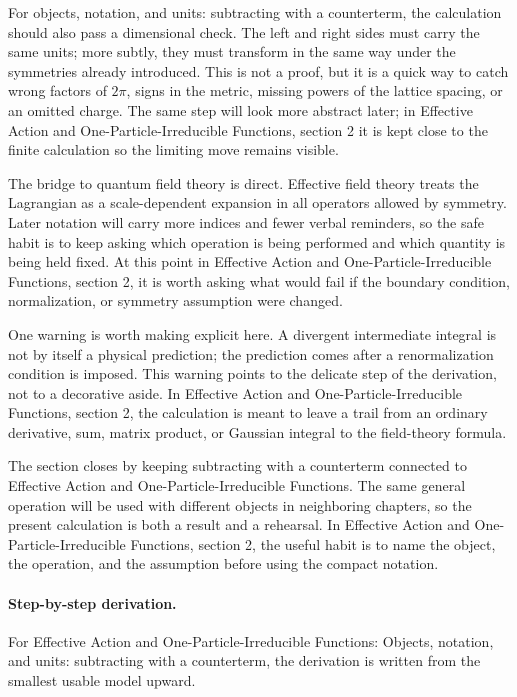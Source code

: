 For objects, notation, and units: subtracting with a counterterm, the calculation should also pass a dimensional check.  The left and right sides must carry the same units; more subtly, they must transform in the same way under the symmetries already introduced.  This is not a proof, but it is a quick way to catch wrong factors of \(2\pi\), signs in the metric, missing powers of the lattice spacing, or an omitted charge.  The same step will look more abstract later; in Effective Action and One-Particle-Irreducible Functions, section 2 it is kept close to the finite calculation so the limiting move remains visible.

The bridge to quantum field theory is direct.  Effective field theory treats the Lagrangian as a scale-dependent expansion in all operators allowed by symmetry.  Later notation will carry more indices and fewer verbal reminders, so the safe habit is to keep asking which operation is being performed and which quantity is being held fixed.  At this point in Effective Action and One-Particle-Irreducible Functions, section 2, it is worth asking what would fail if the boundary condition, normalization, or symmetry assumption were changed.

One warning is worth making explicit here.  A divergent intermediate integral is not by itself a physical prediction; the prediction comes after a renormalization condition is imposed.  This warning points to the delicate step of the derivation, not to a decorative aside.  In Effective Action and One-Particle-Irreducible Functions, section 2, the calculation is meant to leave a trail from an ordinary derivative, sum, matrix product, or Gaussian integral to the field-theory formula.

The section closes by keeping subtracting with a counterterm connected to Effective Action and One-Particle-Irreducible Functions.  The same general operation will be used with different objects in neighboring chapters, so the present calculation is both a result and a rehearsal.  In Effective Action and One-Particle-Irreducible Functions, section 2, the useful habit is to name the object, the operation, and the assumption before using the compact notation.



\paragraph{Step-by-step derivation.}

For Effective Action and One-Particle-Irreducible Functions: Objects, notation, and units: subtracting with a counterterm, the derivation is written from the smallest usable model upward.

